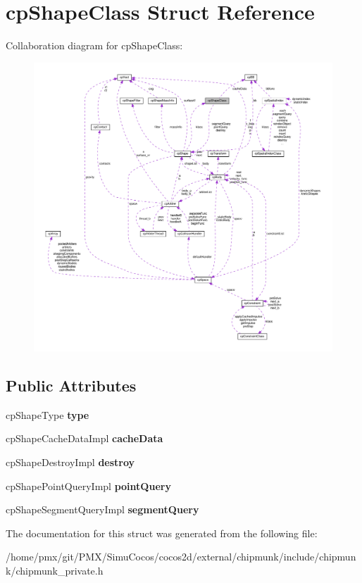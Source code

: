 \hypertarget{structcpShapeClass}{}\section{cp\+Shape\+Class Struct Reference}
\label{structcpShapeClass}


Collaboration diagram for cp\+Shape\+Class\+:
\nopagebreak
\begin{figure}[H]
\begin{center}
\leavevmode
\includegraphics[width=350pt]{structcpShapeClass__coll__graph}
\end{center}
\end{figure}
\subsection*{Public Attributes}
\begin{DoxyCompactItemize}
\item 
\mbox{\label{structcpShapeClass_a9715799d3a01fbd59636ddff5c8db804}} 
cp\+Shape\+Type {\bfseries type}
\item 
\mbox{\label{structcpShapeClass_a706a7db5c2ea333f48d95c873429c516}} 
cp\+Shape\+Cache\+Data\+Impl {\bfseries cache\+Data}
\item 
\mbox{\label{structcpShapeClass_a8b4a3c49681c00bba3eb47dff352d833}} 
cp\+Shape\+Destroy\+Impl {\bfseries destroy}
\item 
\mbox{\label{structcpShapeClass_ae24887377912c675605975d18849de79}} 
cp\+Shape\+Point\+Query\+Impl {\bfseries point\+Query}
\item 
\mbox{\label{structcpShapeClass_ac20debbb5fbd07165d38185e7f4c8989}} 
cp\+Shape\+Segment\+Query\+Impl {\bfseries segment\+Query}
\end{DoxyCompactItemize}


The documentation for this struct was generated from the following file\+:\begin{DoxyCompactItemize}
\item 
/home/pmx/git/\+P\+M\+X/\+Simu\+Cocos/cocos2d/external/chipmunk/include/chipmunk/chipmunk\+\_\+private.\+h\end{DoxyCompactItemize}
